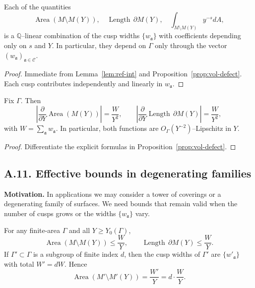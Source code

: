 \begin{lemma}\label{lem:linear-w}
Each of the quantities
\[
\operatorname{Area}(M\setminus M(Y)),\quad
\operatorname{Length}\,\partial M(Y),\quad
\int_{M\setminus M(Y)} y^{-s} dA,
\]
is a $\mathbb Q$–linear combination of the cusp widths
$\{w_{\mathfrak a}\}$ with coefficients depending only on $s$ and $Y$. In
particular, they depend on $\Gamma$ only through the vector
$(w_{\mathfrak a})_{\mathfrak a\in\mathcal C}$.
\end{lemma}

\begin{proof}
Immediate from Lemma~\ref{lem:ref-int} and Proposition~\ref{prop:vol-defect}.
Each cusp contributes independently and linearly in $w_{\mathfrak a}$.
\end{proof}

\begin{proposition}\label{prop:lipschitz-Y}
Fix $\Gamma$. Then
\[
\left|\frac{\partial}{\partial Y}\operatorname{Area}(M(Y))\right|
=\frac{W}{Y^2},\qquad
\left|\frac{\partial}{\partial Y}\operatorname{Length}\,\partial M(Y)\right|
=\frac{W}{Y^2},
\]
with $W=\sum_{\mathfrak a} w_{\mathfrak a}$. In particular, both functions are
$O_\Gamma(Y^{-2})$–Lipschitz in $Y$.
\end{proposition}

\begin{proof}
Differentiate the explicit formulas in Proposition~\ref{prop:vol-defect}.
\end{proof}

\subsection*{A.11. Effective bounds in degenerating families}

\noindent
\textbf{Motivation.}
In applications we may consider a tower of coverings or a degenerating family of
surfaces. We need bounds that remain valid when the number of cusps grows or the
widths $\{w_{\mathfrak a}\}$ vary.

\begin{lemma}\label{lem:family}
For any finite-area $\Gamma$ and all $Y\ge Y_0(\Gamma)$,
\[
\operatorname{Area}(M\setminus M(Y))\le \frac{W}{Y},\qquad
\operatorname{Length}\,\partial M(Y)\le \frac{W}{Y}.
\]
If $\Gamma'\subset \Gamma$ is a subgroup of finite index $d$, then the cusp
widths of $\Gamma'$ are $\{w'_{\mathfrak a}\}$ with total $W' = dW$. Hence
\[
\operatorname{Area}(M'\setminus M'(Y))=\frac{W'}{Y}=d\cdot\frac{W}{Y}.
\]
\end{lemma}


